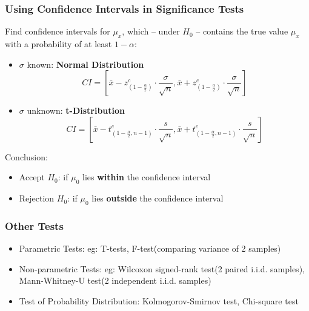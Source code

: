 \subsubsection{Using Confidence Intervals in Significance Tests}
Find confidence intervals for $\mu_x$, which -- under $H_0$ -- contains the true value $\mu_x$ with a probability of at least $1 - \alpha$: 
\begin{itemize}
	\item $\sigma$ known: \textbf{Normal Distribution}
	$$CI = [\bar{x} - z^c_{(1-\frac{\alpha}{2})} \cdot \frac{\sigma}{\sqrt{n}}, \bar{x} + z^c_{(1-\frac{\alpha}{2})} \cdot \frac{\sigma}{\sqrt{n}}]$$
	\item $\sigma$ unknown: \textbf{t-Distribution}
	$$CI = [\bar{x} - t^c_{(1-\frac{\alpha}{2}, n-1)} \cdot \frac{s}{\sqrt{n}}, \bar{x} + t^c_{(1-\frac{\alpha}{2}, n-1)} \cdot \frac{s}{\sqrt{n}}]$$
\end{itemize}	
Conclusion:
\begin{itemize}
	\item Accept $H_0$: if $\mu_0$ lies \textbf{within} the confidence interval
	\item Rejection $H_0$: if $\mu_0$ lies \textbf{outside} the confidence interval
\end{itemize}

\subsubsection{Other Tests}
\begin{itemize}
	\item Parametric Tests: eg: T-tests,  F-test(comparing variance of 2 samples)
	\item Non-parametric Tests: eg: Wilcoxon signed-rank test(2 paired i.i.d. samples), Mann-Whitney-U test(2 independent i.i.d. samples)
	\item Test of Probability Distribution: Kolmogorov-Smirnov test, Chi-square test
\end{itemize}

